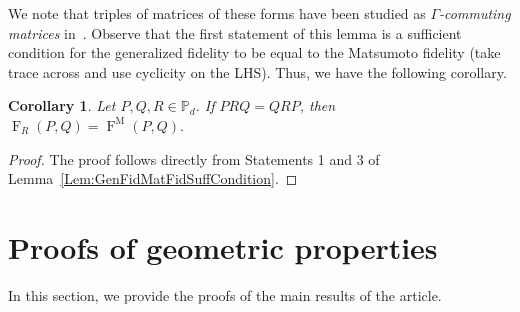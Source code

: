 \documentclass[12pt]{article}
\newtheorem{cor}[theorem]{Corollary} %
\theoremstyle{definition}
\begin{document}
We note that triples of matrices of these forms have been studied as \textit{$\Gamma$-commuting matrices} in~\cite{lawson2008gamma}. Observe that the first statement of this lemma is a sufficient condition for the generalized fidelity to be equal to the Matsumoto fidelity (take trace across and use cyclicity on the LHS). Thus, we have the following corollary.

\begin{theorembox}
\begin{cor} \label{Cor:GenFid2MatsFid}
        Let $P,Q,R \in \mathbb P_d$. If $P R Q = Q R P$, then $\operatorname{F}_R(P,Q) = \operatorname{F}^\mathrm M(P,Q). $
\end{cor}
\end{theorembox}
\begin{proof}
    The proof follows directly from Statements 1 and 3 of Lemma~\ref{Lem:GenFidMatFidSuffCondition}.
\end{proof}


\section{Proofs of geometric properties} \label{App:GeometricProperties}
In this section, we provide the proofs of the main results of the article. 
\end{document}
